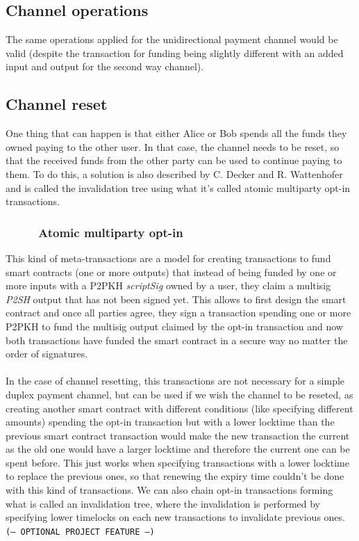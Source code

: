 \documentclass[12pt,journal,compsoc]{IEEEtran}
\newcommand{\code}[1]{\texttt{#1}}
\begin{document}
\subsection{Channel operations}
The same operations applied for the unidirectional payment channel would be valid (despite the transaction for funding being slightly different with an added input and output for the second way channel).
\subsection{Channel reset}
One thing that can happen is that either Alice or Bob spends all the funds they owned paying to the other user. In that case, the channel needs to be reset, so that the received funds from the other party can be used to continue paying to them. To do this, a solution is also described by C. Decker and R. Wattenhofer\cite{decker2015fast} and is called the invalidation tree using what it's called atomic multiparty opt-in transactions.
\subsubsection{\ \ \ \ \ Atomic multiparty opt-in}
This kind of meta-transactions are a model for creating transactions to fund smart contracts (one or more outputs) that instead of being funded by one or more inputs with a P2PKH \textit{scriptSig} owned by a user, they claim a multisig \textit{P2SH} output that has not been signed yet. This allows to first design the smart contract and once all parties agree, they sign a transaction spending one or more P2PKH to fund the multisig output claimed by the opt-in transaction and now both transactions have funded the smart contract in a secure way no matter the order of signatures.\\\\
In the case of channel resetting, this transactions are not necessary for a simple duplex payment channel, but can be used if we wish the channel to be reseted, as creating another smart contract with different conditions (like specifying different amounts) spending the opt-in transaction but with a lower locktime than the previous smart contract transaction would make the new transaction the current as the old one would have a larger locktime and therefore the current one can be spent before. This just works when specifying transactions with a lower locktime to replace the previous ones, so that renewing the expiry time couldn't be done with this kind of transactions. We can also chain opt-in transactions forming what is called an invalidation tree, where the invalidation is performed by specifying lower timelocks on each new transactions to invalidate previous ones.
\\\code{(-- OPTIONAL PROJECT FEATURE --)}
\end{document}

